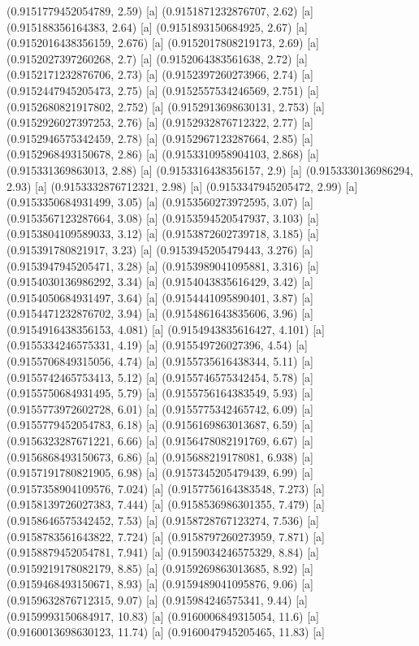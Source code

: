 {{{(0.9151779452054789, 2.59) [a] 
(0.9151871232876707, 2.62) [a] 
(0.915188356164383, 2.64) [a] 
(0.9151893150684925, 2.67) [a] 
(0.9152016438356159, 2.676) [a] 
(0.9152017808219173, 2.69) [a] 
(0.9152027397260268, 2.7) [a] 
(0.9152064383561638, 2.72) [a] 
(0.9152171232876706, 2.73) [a] 
(0.9152397260273966, 2.74) [a] 
(0.9152447945205473, 2.75) [a] 
(0.9152557534246569, 2.751) [a] 
(0.9152680821917802, 2.752) [a] 
(0.9152913698630131, 2.753) [a] 
(0.9152926027397253, 2.76) [a] 
(0.9152932876712322, 2.77) [a] 
(0.9152946575342459, 2.78) [a] 
(0.9152967123287664, 2.85) [a] 
(0.9152968493150678, 2.86) [a] 
(0.9153310958904103, 2.868) [a] 
(0.915331369863013, 2.88) [a] 
(0.9153316438356157, 2.9) [a] 
(0.9153330136986294, 2.93) [a] 
(0.9153332876712321, 2.98) [a] 
(0.9153347945205472, 2.99) [a] 
(0.9153350684931499, 3.05) [a] 
(0.9153560273972595, 3.07) [a] 
(0.9153567123287664, 3.08) [a] 
(0.9153594520547937, 3.103) [a] 
(0.9153804109589033, 3.12) [a] 
(0.9153872602739718, 3.185) [a] 
(0.915391780821917, 3.23) [a] 
(0.9153945205479443, 3.276) [a] 
(0.9153947945205471, 3.28) [a] 
(0.9153989041095881, 3.316) [a] 
(0.9154030136986292, 3.34) [a] 
(0.9154043835616429, 3.42) [a] 
(0.9154050684931497, 3.64) [a] 
(0.9154441095890401, 3.87) [a] 
(0.9154471232876702, 3.94) [a] 
(0.9154861643835606, 3.96) [a] 
(0.9154916438356153, 4.081) [a] 
(0.9154943835616427, 4.101) [a] 
(0.9155334246575331, 4.19) [a] 
(0.915549726027396, 4.54) [a] 
(0.9155706849315056, 4.74) [a] 
(0.9155735616438344, 5.11) [a] 
(0.9155742465753413, 5.12) [a] 
(0.9155746575342454, 5.78) [a] 
(0.9155750684931495, 5.79) [a] 
(0.9155756164383549, 5.93) [a] 
(0.9155773972602728, 6.01) [a] 
(0.9155775342465742, 6.09) [a] 
(0.9155779452054783, 6.18) [a] 
(0.9156169863013687, 6.59) [a] 
(0.9156323287671221, 6.66) [a] 
(0.9156478082191769, 6.67) [a] 
(0.9156868493150673, 6.86) [a] 
(0.915688219178081, 6.938) [a] 
(0.9157191780821905, 6.98) [a] 
(0.9157345205479439, 6.99) [a] 
(0.9157358904109576, 7.024) [a] 
(0.9157756164383548, 7.273) [a] 
(0.9158139726027383, 7.444) [a] 
(0.9158536986301355, 7.479) [a] 
(0.9158646575342452, 7.53) [a] 
(0.9158728767123274, 7.536) [a] 
(0.9158783561643822, 7.724) [a] 
(0.9158797260273959, 7.871) [a] 
(0.9158879452054781, 7.941) [a] 
(0.9159034246575329, 8.84) [a] 
(0.9159219178082179, 8.85) [a] 
(0.9159269863013685, 8.92) [a] 
(0.9159468493150671, 8.93) [a] 
(0.9159489041095876, 9.06) [a] 
(0.9159632876712315, 9.07) [a] 
(0.915984246575341, 9.44) [a] 
(0.9159993150684917, 10.83) [a] 
(0.9160006849315054, 11.6) [a] 
(0.9160013698630123, 11.74) [a] 
(0.9160047945205465, 11.83) [a] 
}}}
